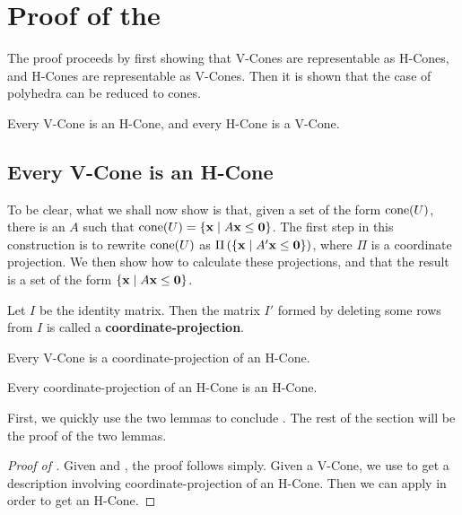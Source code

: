 \chapter{Proof of the \MWT}

The proof proceeds by first showing that V-Cones are representable as H-Cones, and H-Cones are representable as V-Cones.  Then it is shown that the case of polyhedra can be reduced to cones.

\begin{Thm} \label{MWTFC}
		Every V-Cone is an H-Cone, and every H-Cone is a V-Cone.
\end{Thm}

\section{Every V-Cone is an H-Cone}

To be clear, what we shall now show is that, given a set of the form $\operatorname{cone}(U)$, there is an $A$ such that $\operatorname{cone}(U) = \left\{\mathbf{x}\;|\; A\mathbf{x}\leq\mathbf{0}\right\}$.  The first step in this construction is to rewrite $\operatorname{cone}(U)$ as $\Pi\left(\left\{\mathbf{x}\;|\; A'\mathbf{x}\leq\mathbf{0}\right\}\right)$, where $\Pi$ is a coordinate projection.  We then show how to calculate these projections, and that the result is a set of the form $\left\{\mathbf{x}\;|\; A\mathbf{x}\leq\mathbf{0}\right\}$.

\begin{Def}
	Let $I$ be the identity matrix.  Then the matrix $I'$ formed by deleting some rows from $I$ is called a \textbf{coordinate-projection}.
\end{Def}

\begin{Lemma}\label{vconelift}
	 Every V-Cone is a coordinate-projection of an H-Cone.
\end{Lemma}

\begin{Lemma}\label{hconeproject}
	 Every coordinate-projection of an H-Cone is an H-Cone.
\end{Lemma}

First, we quickly use the two lemmas to conclude .  The rest of the section will be the proof of the two lemmas.

\begin{proof}[Proof of ]
	Given  and , the proof follows simply.  Given a V-Cone, we use  to get a description involving coordinate-projection of an H-Cone.  Then we can apply  in order to get an H-Cone.
\end{proof}

